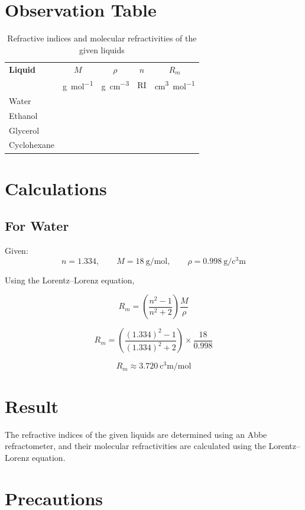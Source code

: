 \documentclass[12pt,a4paper]{article}
\begin{document}
\section*{Observation Table}

\begin{table}[h]
\centering
\caption{Refractive indices and molecular refractivities of the given liquids}
\begin{tabular}{lcccc}
\toprule
\textbf{Liquid} & \textbf{$M$} & \textbf{$\rho$} & \textbf{$n$} & \textbf{$R_m$} \\
 & \si{\gram\per\mole} & \si{\gram\per\cubic\centi\meter} & RI & \si{\cubic\centi\meter\per\mole} \\
\midrule
Water      & & & & \\
Ethanol    & & & & \\
Glycerol   & & & & \\
Cyclohexane & & & & \\
\bottomrule
\end{tabular}
\end{table}

\section*{Calculations}

\subsection*{For Water}

Given:
\[
n = 1.334,\qquad M = 18~\si{\gram\per\mole},
\qquad \rho = 0.998~\si{\gram\per\cubic\centi\meter}
\]

Using the Lorentz--Lorenz equation,

\[
R_m =
\left(\frac{n^2-1}{n^2+2}\right)
\frac{M}{\rho}
\]

\[
R_m =
\left(
\frac{(1.334)^2-1}{(1.334)^2+2}
\right)
\times
\frac{18}{0.998}
\]

\[
R_m \approx 3.720~\si{\cubic\centi\meter\per\mole}
\]

\section*{Result}

The refractive indices of the given liquids are determined using an Abbe refractometer, and their molecular refractivities are calculated using the Lorentz--Lorenz equation.

\section*{Precautions}
\end{document}
